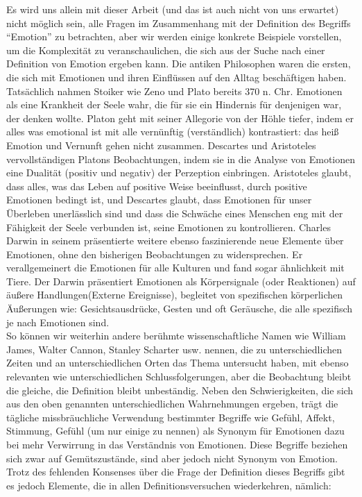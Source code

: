 Es wird uns allein mit dieser Arbeit (und das ist auch nicht von uns erwartet) nicht möglich sein, alle Fragen im Zusammenhang mit der Definition des Begriffs ``Emotion'' zu betrachten, aber wir werden einige konkrete Beispiele vorstellen, um die Komplexität zu veranschaulichen, die sich aus der Suche nach einer Definition von Emotion ergeben kann.  
Die antiken Philosophen\cite{geslin13} waren die ersten, die sich mit Emotionen und ihren Einflüssen auf den Alltag beschäftigen haben. 
Tatsächlich nahmen Stoiker wie Zeno und Plato bereits 370 n. Chr. Emotionen als eine Krankheit der Seele wahr, die für sie ein Hindernis für denjenigen war, der denken wollte. 
Platon geht mit seiner Allegorie von der Höhle tiefer, indem er alles was emotional ist  mit alle vernünftig (verständlich) kontrastiert: das heiß Emotion und Vernunft gehen nicht zusammen. 
Descartes und Aristoteles vervollständigen Platons Beobachtungen, indem sie in die Analyse von Emotionen eine Dualität (positiv und negativ) der Perzeption einbringen. 
Aristoteles glaubt, dass alles, was das Leben auf positive Weise beeinflusst, durch positive Emotionen bedingt ist, und Descartes glaubt, dass Emotionen für unser Überleben unerlässlich sind und dass die Schwäche eines Menschen eng mit der Fähigkeit der Seele verbunden ist, seine Emotionen zu kontrollieren. 
Charles Darwin in seinem präsentierte weitere ebenso faszinierende neue Elemente über Emotionen, ohne den bisherigen Beobachtungen zu widersprechen\cite{darwin1872}. 
Er verallgemeinert die Emotionen für alle Kulturen und fand sogar ähnlichkeit mit Tiere. 
Der Darwin präsentiert  Emotionen  als Körpersignale (oder Reaktionen) auf äußere Handlungen(Externe Ereignisse), begleitet von spezifischen körperlichen Äußerungen wie: Gesichtsausdrücke, Gesten und oft Geräusche, die alle  spezifisch je nach Emotionen sind. \\


So können wir weiterhin andere berühmte wissenschaftliche Namen wie William James\cite{james1884}, Walter Cannon\cite{cannon32}, Stanley Scharter\cite{schachter59} usw. nennen, die zu unterschiedlichen Zeiten und an unterschiedlichen Orten das Thema untersucht haben, mit ebenso relevanten wie unterschiedlichen Schlussfolgerungen, aber die Beobachtung bleibt die gleiche, die Definition bleibt unbeständig.
Neben den Schwierigkeiten, die sich aus den oben genannten unterschiedlichen Wahrnehmungen ergeben, trägt die  tägliche missbräuchliche Verwendung bestimmter Begriffe wie Gefühl, Affekt, Stimmung, Gefühl (um nur einige zu nennen) als Synonym für Emotionen dazu bei  mehr Verwirrung in das Verständnis von Emotionen. Diese Begriffe beziehen sich zwar auf Gemütszustände, sind aber jedoch nicht Synonym von Emotion\cite{plamper12}.
Trotz des fehlenden Konsenses über die Frage der Definition dieses Begriffs gibt es jedoch Elemente, die in allen Definitionsversuchen wiederkehren, nämlich: 

